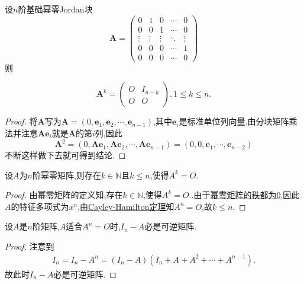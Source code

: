 \documentclass[../../main.tex]{subfiles}%
\begin{document}
\begin{proposition}[基础幂零Jordan块]\label{proposition:基础幂零Jordan块}
设\(n\)阶基础幂零Jordan块
\[
\boldsymbol{A}=\left(\begin{array}{ccccc}
0 & 1 & 0 & \cdots & 0 \\
0 & 0 & 1 & \cdots & 0 \\
\vdots & \vdots & \vdots & \ddots & \vdots \\
0 & 0 & 0 & \cdots & 1 \\
0 & 0 & 0 & \cdots & 0
\end{array}\right)
\]
则

\[
\boldsymbol{A}^{k}=\left(\begin{array}{cc}
O & I_{n - k} \\
O & O
\end{array}\right),1 \leqslant  k \leqslant  n.
\]
\end{proposition}
\begin{proof}

将\(\boldsymbol{A}\)写为\(\boldsymbol{A}=(0,\mathbf{e}_{1},\mathbf{e}_{2},\cdots,\mathbf{e}_{n - 1})\),其中\(\mathbf{e}_{i}\)是标准单位列向量.由分块矩阵乘法并注意\(\boldsymbol{A}\mathbf{e}_{i}\)就是\(\boldsymbol{A}\)的第\(i\)列,因此
\[
\boldsymbol{A}^{2}=(0,\boldsymbol{A}\mathbf{e}_{1},\boldsymbol{A}\mathbf{e}_{2},\cdots,\boldsymbol{A}\mathbf{e}_{n - 1})=(0,0,\mathbf{e}_{1},\cdots,\mathbf{e}_{n - 2})
\]
不断这样做下去就可得到结论.

\end{proof}

\begin{proposition}
设$A$为$n$阶幂零矩阵,则存在$k\in \mathbb{N}$且$k\leqslant n$,使得$A^k=O.$
\end{proposition}
\begin{proof}

由幂零矩阵的定义知,存在$k\in \mathbb{N}$,使得$A^k=O.$.由于\hyperref[proposition:幂零矩阵关于特征值的充要条件]{幂零矩阵的秩都为0},因此$A$的特征多项式为$x^n$,由\hyperref[theorem:Cayley-Hamilton定理]{Cayley-Hamilton定理}知$A^n=O$,故$k\leqslant n.$

\end{proof}

\begin{example}\label{example:56471456}
设\(A\)是\(n\)阶矩阵,\(A\)适合\(A^n = O\)时,\(I_n - A\)必是可逆矩阵.
\end{example}
\begin{proof}

注意到
\begin{align*}
I_n=I_n-A^n=\left( I_n-A \right) \left( I_n+A+A^2+\cdots +A^{n-1} \right) .
\end{align*}
故此时\(I_n - A\)必是可逆矩阵.

\end{proof}
\end{document}
